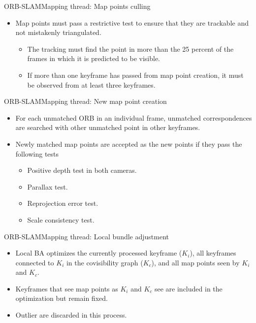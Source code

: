 \documentclass{beamer}
\begin{document}
\begin{frame}{ORB-SLAM}{Mapping thread: Map points culling}
  \begin{itemize}
      \item{
      Map points must pass a restrictive test to ensure that they are trackable and not mistakenly triangulated.
      \begin{itemize}
          \item{
          The tracking must find the point in more than the 25 percent of the frames in which it is predicted to be visible.
          }
          \item{
          If more than one keyframe has passed from map point creation, it must be observed from at least three keyframes.
          }
      \end{itemize}
      }
  \end{itemize}
\end{frame}

\begin{frame}{ORB-SLAM}{Mapping thread: New map point creation}
    \begin{itemize}
        \item{
        For each unmatched ORB in an individual frame, unmatched correspondences are searched with other unmatched point in other keyframes.
        }
        \item{
        Newly matched map points are accepted as the new points if they pass the following tests
        \begin{itemize}
            \item{
            Positive depth test in both cameras.
            }
            \item{
            Parallax test.
            }
            \item{
            Reprojection error test.
            }
            \item{
            Scale consistency test.
            }
        \end{itemize}
        }
    \end{itemize}
\end{frame}

\begin{frame}{ORB-SLAM}{Mapping thread: Local bundle adjustment}
  \begin{itemize}
      \item{
      Local BA optimizes the currently processed keyframe ($K_{i}$), all keyframes connected to $K_{i}$ in the covisibility graph ($K_{c}$), and all map points seen by $K_{i}$ and $K_{c}$.
      }
      \item{
      Keyframes that see map points as $K_{i}$ and $K_{c}$ see are included in the optimization but remain fixed.
      }
      \item{
      Outlier are discarded in this process.
      }
  \end{itemize}
\end{frame}
\end{document}
